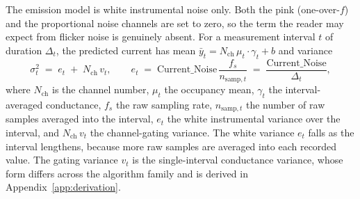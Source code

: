 The emission model is white instrumental noise only. Both the pink (one-over-$f$)
and the proportional noise channels are set to zero, so the term the reader may
expect from flicker noise is genuinely absent.
For a measurement interval $t$ of duration $\Delta_t$, the predicted current has
mean $\bar y_t = N_{\mathrm{ch}}\,\mu_t\!\cdot\!\gamma_t + b$ and variance
\[
  \sigma_t^2 \;=\; e_t \;+\; N_{\mathrm{ch}}\,v_t ,
  \qquad
  e_t \;=\; \mathrm{Current\_Noise}\,\frac{f_s}{n_{\mathrm{samp},t}}
        \;=\; \frac{\mathrm{Current\_Noise}}{\Delta_t},
\]
where $N_{\mathrm{ch}}$ is the channel number, $\mu_t$ the occupancy mean, $\gamma_t$
the interval-averaged conductance, $f_s$ the raw sampling rate, $n_{\mathrm{samp},t}$
the number of raw samples averaged into the interval, $e_t$ the white instrumental
variance over the interval, and $N_{\mathrm{ch}}\,v_t$ the channel-gating variance.
The white variance $e_t$ falls as the interval lengthens, because more raw samples
are averaged into each recorded value. The gating variance $v_t$ is the
single-interval conductance variance, whose form differs across the algorithm
family and is derived in Appendix~\ref{app:derivation}.

